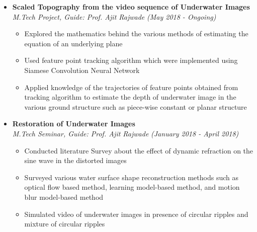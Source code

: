 \documentclass[a4paper,10pt]{article}
\newcommand{\isep}{-2 pt}
\begin{document}
\begin{itemize}
\item \textbf{Scaled Topography from the video sequence of Underwater Images}  \\
    \emph{M.Tech Project, Guide: Prof. Ajit Rajwade} \hfill {\emph{(May 2018 - Ongoing)}}
    \\[-0.6cm]
    \begin{itemize}
        \item Explored the mathematics behind the various methods of estimating the equation of an underlying plane
    	\item Used feature point tracking algorithm which were implemented using Siamese Convolution Neural Network
    	\item Applied knowledge of the trajectories of feature points obtained from tracking algorithm to estimate the depth of underwater	image in the various ground structure such as piece-wise constant or planar structure\\ [-0.6cm]
    \end{itemize}

\item \textbf{Restoration of Underwater Images} \\
    \emph{M.Tech Seminar, Guide:  Prof.  Ajit Rajwade}
    \hfill {\emph{(January 2018 - April 2018)}}
    \\ [-0.6cm]
      \begin{itemize}\itemsep \isep
        \item Conducted literature Survey  about the effect of dynamic refraction on the sine wave in the distorted images
        
        \vspace{0.07cm}
        
        \item Surveyed various water surface shape reconstruction methods such as optical flow based method, learning model-based method, and motion blur model-based method
        \vspace{0.07cm}
        
        \item Simulated video of underwater images in presence of circular ripples and mixture of circular ripples
    \\ [-0.5cm]
      \end{itemize}
\end{itemize}
\end{document}
